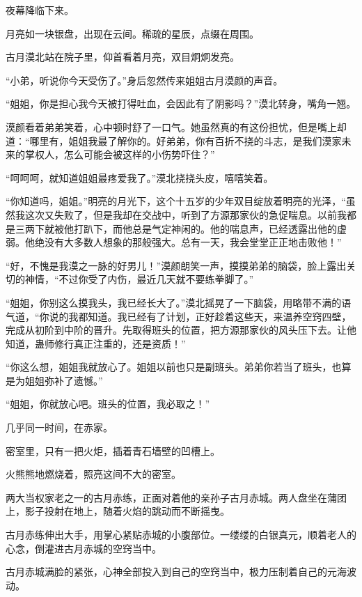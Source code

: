 
\begin{this_body}



夜幕降临下来。

月亮如一块银盘，出现在云间。稀疏的星辰，点缀在周围。

古月漠北站在院子里，仰首看着月亮，双目炯炯发亮。

“小弟，听说你今天受伤了。”身后忽然传来姐姐古月漠颜的声音。

“姐姐，你是担心我今天被打得吐血，会因此有了阴影吗？”漠北转身，嘴角一翘。

漠颜看着弟弟笑着，心中顿时舒了一口气。她虽然真的有这份担忧，但是嘴上却道：“哪里有，姐姐我最了解你的。好弟弟，你有百折不挠的斗志，是我们漠家未来的掌权人，怎么可能会被这样的小伤势吓住？”

“呵呵呵，就知道姐姐最疼爱我了。”漠北挠挠头皮，嘻嘻笑着。

“你知道吗，姐姐。”明亮的月光下，这个十五岁的少年双目绽放着明亮的光泽，“虽然我这次又失败了，但是我却在交战中，听到了方源那家伙的急促喘息。以前我都是三两下就被他打趴下，而他总是气定神闲的。他的喘息声，已经透露出他的虚弱。他绝没有大多数人想象的那般强大。总有一天，我会堂堂正正地击败他！”

“好，不愧是我漠之一脉的好男儿！”漠颜朗笑一声，摸摸弟弟的脑袋，脸上露出关切的神情，“不过你受了内伤，最近几天就不要练拳脚了。”

“姐姐，你别这么摸我头，我已经长大了。”漠北摇晃了一下脑袋，用略带不满的语气道，“你说的我都知道。我已经有了计划，正好趁着这些天，来温养空窍四壁，完成从初阶到中阶的晋升。先取得班头的位置，把方源那家伙的风头压下去。让他知道，蛊师修行真正注重的，还是资质！”

“你这么想，姐姐我就放心了。姐姐以前也只是副班头。弟弟你若当了班头，也算是为姐姐弥补了遗憾。”

“姐姐，你就放心吧。班头的位置，我必取之！”

几乎同一时间，在赤家。

密室里，只有一把火炬，插着青石墙壁的凹槽上。

火熊熊地燃烧着，照亮这间不大的密室。

两大当权家老之一的古月赤练，正面对着他的亲孙子古月赤城。两人盘坐在蒲团上，影子投射在地上，随着火焰的跳动而不断摇曳。

古月赤练伸出大手，用掌心紧贴赤城的小腹部位。一缕缕的白银真元，顺着老人的心念，倒灌进古月赤城的空窍当中。

古月赤城满脸的紧张，心神全部投入到自己的空窍当中，极力压制着自己的元海波动。


\end{this_body}
